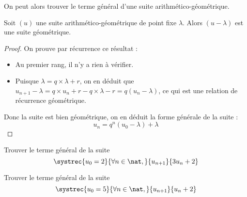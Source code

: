 On peut alors trouver le terme général d'une suite arithmético-géométrique.

\begin{them}
    Soit $(u)$ une suite arithmético-géométrique de point fixe $\lambda$. Alors $(u-\lambda)$ est une suite géométrique.
\end{them}
\begin{proof}
    On prouve par récurrence ce résultat :
    \begin{itemize}[label=$\bullet$]
        \item Au premier rang, il n'y a rien à vérifier.
        \item Puisque $\lambda=q\times \lambda + r$, on en déduit que $u_{n+1}-\lambda = q \times u_n + r - q\times \lambda - r = q(u_n-\lambda)$, ce qui est une relation de récurrence géométrique.
    \end{itemize}
    Donc la suite est bien géométrique, on en déduit la forme générale de la suite :
    $$u_n = q^n(u_0-\lambda) + \lambda$$
\end{proof}

\begin{exo}
    Trouver le terme général de la suite $$\systrec{u_0=2}{\forall n\in \nat,}{u_{n+1}}{3u_n+2}$$
\end{exo}
\begin{exo}
    Trouver le terme général de la suite $$\systrec{u_0=5}{\forall n\in \nat,}{u_{n+1}}{u_n+2}$$
\end{exo}

\newpage